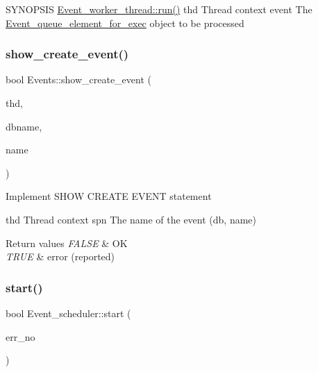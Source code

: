S\+Y\+N\+O\+P\+S\+IS \mbox{\hyperlink{group__Event__Scheduler_ga3226ac4e79d64e27ce9eebed2234d2c1}{Event\+\_\+worker\+\_\+thread\+::run()}} thd Thread context event The \mbox{\hyperlink{classEvent__queue__element__for__exec}{Event\+\_\+queue\+\_\+element\+\_\+for\+\_\+exec}} object to be processed \mbox{\label{group__Event__Scheduler_ga99ad9b87a2e1ce1b69c8f9c31e4ee5d1}} 
\subsubsection{\texorpdfstring{show\+\_\+create\+\_\+event()}{show\_create\_event()}}
{\footnotesize\ttfamily bool Events\+::show\+\_\+create\+\_\+event (\begin{DoxyParamCaption}\item[{T\+HD $\ast$}]{thd,  }\item[{L\+E\+X\+\_\+\+S\+T\+R\+I\+NG}]{dbname,  }\item[{L\+E\+X\+\_\+\+S\+T\+R\+I\+NG}]{name }\end{DoxyParamCaption})\hspace{0.3cm}{\ttfamily [static]}}

Implement S\+H\+OW C\+R\+E\+A\+TE E\+V\+E\+NT statement \begin{DoxyVerb}thd   Thread context
spn   The name of the event (db, name)
\end{DoxyVerb}



\begin{DoxyRetVals}{Return values}
{\em F\+A\+L\+SE} & OK \\
\hline
{\em T\+R\+UE} & error (reported) \\
\hline
\end{DoxyRetVals}
\mbox{\label{group__Event__Scheduler_gaf9de87da28f91daf6bbeb577dc029548}} 
\subsubsection{\texorpdfstring{start()}{start()}}
{\footnotesize\ttfamily bool Event\+\_\+scheduler\+::start (\begin{DoxyParamCaption}\item[{int $\ast$}]{err\+\_\+no }\end{DoxyParamCaption})}

